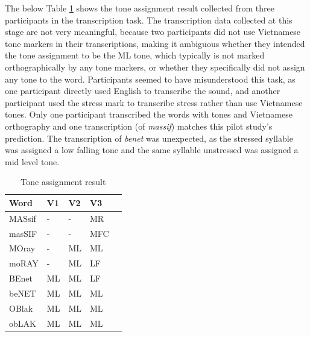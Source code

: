 \documentclass[a4paper]{article}
\begin{document}
The below Table \ref{tab:table14} shows the tone assignment result collected from three participants in the transcription task. The transcription data collected at this stage are not very meaningful, because two participants did not use Vietnamese tone markers in their transcriptions, making it ambiguous whether they intended the tone assignment to be the ML tone, which typically is not marked orthographically by any tone markers, or whether they specifically did not assign any tone to the word. Participants seemed to have misunderstood this task, as one participant directly used English to transcribe the sound, and another participant used the stress mark to transcribe stress rather than use Vietnamese tones. Only one participant transcribed the words with tones and Vietnamese orthography and one transcription (of \textit{massif}) matches this pilot study's prediction. The transcription of \textit{benet} was unexpected, as the stressed syllable was assigned a low falling tone and the same syllable unstressed was assigned a mid level tone.
\begin{table}[H]
  \begin{center}
    \caption{Tone assignment result}
    \label{tab:table14}
      \begin{tabular}{|p{3cm}|p{3cm}|p{3cm}|p{3cm}|p{3cm}}
      \hline
       Word & V1& V2 & V3\\
    \hline
MASsif  &	- &	- &	MR \\
    \hline
masSIF & -	& -	& MFC \\
    \hline
MOray&- & ML	& ML \\
   \hline
moRAY	& -	& ML & LF \\
    \hline
BEnet	& ML & ML & LF \\
   \hline
beNET	& ML	& ML	&ML \\
   \hline
OBlak &	ML & 	ML	& ML \\
   \hline
obLAK	& ML	 & ML & 	ML \\
   \hline
    \end{tabular}
  \end{center}
\end{table}
\end{document}
